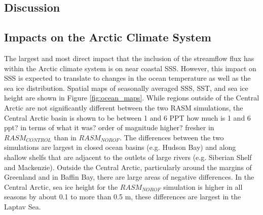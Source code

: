 \documentclass[jgrga, draft]{agutex}
\begin{document}
\begin{article}
\section{Discussion}
\label{sec:discussion}

\subsection{Impacts on the Arctic Climate System}
The largest and most direct impact that the inclusion of the streamflow flux has within the Arctic climate system is on near coastal SSS.
However, this impact on SSS is expected to translate to changes in the ocean temperature as well as the sea ice distribution.
Spatial maps of seasonally averaged SSS, SST, and sea ice height are shown in Figure \ref{fig:ocean_maps}.
While regions outside of the Central Arctic are not significantly different between the two RASM simulations, the Central Arctic basin is shown to be between 1 and 6 PPT {how much is 1 and 6 ppt? in terms of what it was? order of magnitude higher?} fresher in $RASM_{CONTROL}$ than in $RASM_{NOROF}$.
The differences between the two simulations are largest in closed ocean basins (e.g. Hudson Bay) and along shallow shelfs that are adjacent to the outlets of large rivers (e.g. Siberian Shelf and Mackenzie).
Outside the Central Arctic, particularly around the margins of Greenland and in Baffin Bay, there are large areas of negative differences.
In the Central Arctic, sea ice height for the $RASM_{NOROF}$ simulation is higher in all seasons by about 0.1 to more than 0.5 m, these differences are largest in the Laptav Sea.

\end{article}
\end{document}
